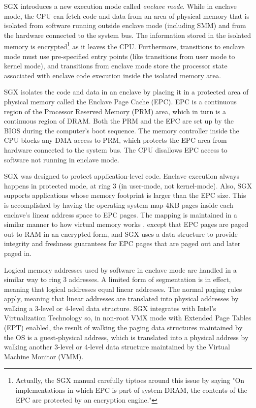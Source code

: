 SGX introduces a new execution mode called \textit{enclave mode}. While in
enclave mode, the CPU can fetch code and data from an area of physical memory
that is isolated from software running outside enclave mode (including SMM) and
from the hardware connected to the system bus. The information stored in the
isolated memory is encrypted\footnote{Actually, the SGX manual carefully
tiptoes around this issue by saying "On implementations in which EPC is part of
system DRAM, the contents of the EPC are protected by an encryption engine."}
as it leaves the CPU. Furthermore, transitions to enclave mode must use
pre-specified entry points (like transitions from user mode to kernel mode),
and transitions from enclave mode store the processor state associated with
enclave code execution inside the isolated memory area.

SGX isolates the code and data in an enclave by placing it in a protected area
of physical memory called the Enclave Page Cache (EPC). EPC is a continuous
region of the Processor Reserved Memory (PRM) area, which in turn is a
continuous region of DRAM. Both the PRM and the EPC are set up by the BIOS
during the computer's boot sequence. The memory controller inside the CPU
blocks any DMA access to PRM, which protects the EPC area from hardware
connected to the system bus. The CPU disallows EPC access to software not
running in enclave mode.

SGX was designed to protect application-level code. Enclave execution always
happens in protected mode, at ring 3 (in user-mode, not kernel-mode). Also, SGX
supports applications whose memory footprint is larger than the EPC size. This
is accomplished by having the operating system map 4KB pages inside each
enclave's linear address space to EPC pages. The mapping is maintained in a
similar manner to how virtual memory works \cite{jacob1998virtual}, except that
EPC pages are paged out to RAM in an encrypted form, and SGX uses a data
structure to provide integrity and freshness guarantees for EPC pages that are
paged out and later paged in.

Logical memory addresses used by software in enclave mode are handled in a
similar way to ring 3 addresses. A limited form of segmentation is in effect,
meaning that logical addresses equal linear addresses. The normal paging rules
apply, meaning that linear addresses are translated into physical addresses
by walking a 3-level or 4-level data structure. SGX integrates with Intel's
Virtualization Technology \cite{uhlig2005intel} so, in non-root VMX mode with
Extended Page Tables (EPT) enabled, the result of walking the paging data
structures maintained by the OS is a guest-physical address, which is
translated into a physical address by walking another 3-level or 4-level
data structure maintained by the Virtual Machine Monitor (VMM).

